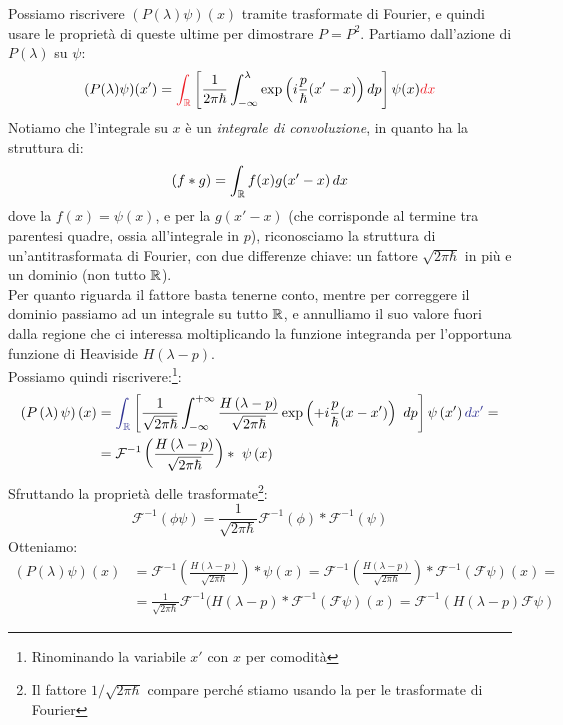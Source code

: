 \documentclass[../../FisicaTeorica.tex]{subfiles}
\begin{document}
Possiamo riscrivere $(P(\lambda)\psi)(x)$ tramite trasformate di Fourier, e quindi usare le proprietà di queste ultime per dimostrare $P=P^2$. Partiamo dall'azione di $P(\lambda)$ su $\psi$:
\[
(P(\lambda)\psi)(x') = \textcolor{Red}{\int_{\bb{R}}}\left[\frac{1}{2\pi \hbar} \int_{-\infty}^\lambda \exp\left (i\frac{p}{\hbar}(x'-x)\right )dp\right ]\psi(x) \textcolor{Red}{dx}
\]
Notiamo che l'integrale  su $x$ è un \textit{integrale di convoluzione}, in quanto ha la struttura di:
\[
(f*g) = \int_{\mathbb{R}} f(x)g(x'-x)\,dx
\]
dove la $f(x) = \psi(x)$, e per la $g(x'-x)$ (che corrisponde al termine tra parentesi quadre, ossia all'integrale in $p$), riconosciamo la struttura di un'antitrasformata di Fourier, con due differenze chiave: un fattore $\sqrt{2\pi\hbar}$ in più e un dominio  (non tutto $\mathbb{R}$).\\
Per quanto riguarda il fattore basta tenerne conto, mentre per correggere il dominio passiamo ad un integrale su tutto $\mathbb{R}$, e annulliamo il suo valore fuori dalla regione che ci interessa moltiplicando la funzione integranda per l'opportuna funzione di Heaviside $H(\lambda-p)$.\\
Possiamo quindi riscrivere:\footnote{Rinominando la variabile $x'$ con $x$ per comodità}:
\begin{align*}
\left(P\left(\lambda\right)\psi\right)\left(x\right)
&=
\textcolor{Blue}{\int_{\bb{R}}}\left [\frac{1}{\sqrt{2\pi\hbar}}\int_{-\infty}^{+\infty}\frac{H\left(\lambda-p\right)}{\sqrt{2\pi\hbar}}\exp\left (+{i\frac{p}{\hbar}(x-x')}\right)\ dp\right ]\psi\left(x'\right)\textcolor{Blue}{dx'}=\\
&=\mathcal{F}^{-1}\left(\frac{H\left(\lambda-p\right)}{\sqrt{2\pi\hbar}} \right )*\ \psi\left(x\right)
\end{align*}
Sfruttando  la proprietà delle trasformate\footnote{Il fattore $1/\sqrt{2\pi\hbar}$ compare perché stiamo usando la  per le trasformate di Fourier}:
\[
\mathcal{F}^{-1}(\phi \psi) =\frac{1}{\sqrt{2\pi\hbar}} \mathcal{F}^{-1}(\phi) * \mathcal{F}^{-1}(\psi)
\]
Otteniamo:
\begin{align*}
(P(\lambda)\psi)(x) &= \mathcal{F}^{-1}\left ( \frac{H(\lambda-p)}{\sqrt{2\pi\hbar}}\right ) * \psi(x) = 
\mathcal{F}^{-1}\left (\frac{H(\lambda-p)}{\sqrt{2\pi\hbar}}\right ) * \mathcal{F}^{-1}(\mathcal{F}\psi)(x) =\\
&= \frac{1}{\sqrt{2\pi\hbar}} \mathcal{F}^{-1}(H(\lambda-p)*\mathcal{F}^{-1}(\mathcal{F}\psi)(x) 
= \mathcal{F}^{-1}(H(\lambda-p)\mathcal{F}\psi)
\end{align*}
\end{document}
